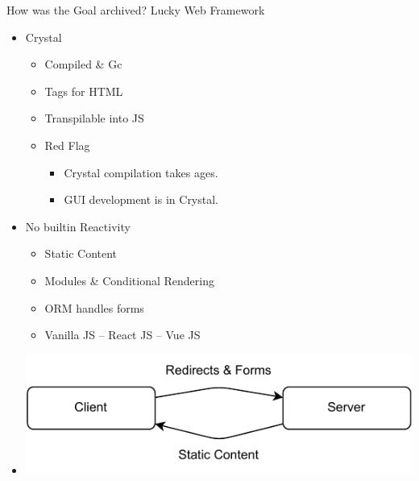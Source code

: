 \documentclass{beamer}
\begin{document}
	\begin{frame}[fragile]{How was the Goal archived?}
		Lucky Web Framework
		\begin{itemize}[<+->]
			\item Crystal
				\begin{itemize}
					\item Compiled \& Gc
					\item Tags for HTML
					\item Transpilable into JS
					\item \color{red} Red Flag \color{black}
					\begin{itemize}
						\item \color{red} Crystal compilation takes ages. \checkmark \color{black}
						\item \color{red} GUI development is in Crystal. \checkmark \color{black}
					\end{itemize}
				\end{itemize}
			\item No builtin Reactivity
				\begin{itemize}
					\item Static Content
					\item Modules \& Conditional Rendering
					\item ORM handles forms
					\item Vanilla JS \--- React JS \--- Vue JS
				\end{itemize}
			\item \includegraphics[height=0.25\textheight]{pictures/client_server/interaction.pdf}
		\end{itemize}		
	\end{frame}
\end{document}
